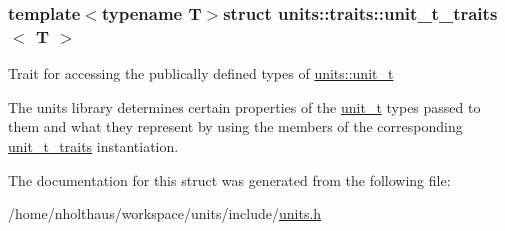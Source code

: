 \subsubsection*{template$<$typename T$>$struct units\+::traits\+::unit\+\_\+t\+\_\+traits$<$ T $>$}

Trait for accessing the publically defined types of {\ttfamily \hyperlink{classunits_1_1unit__t}{units\+::unit\+\_\+t}} 

The units library determines certain properties of the \hyperlink{classunits_1_1unit__t}{unit\+\_\+t} types passed to them and what they represent by using the members of the corresponding \hyperlink{structunits_1_1traits_1_1unit__t__traits}{unit\+\_\+t\+\_\+traits} instantiation. 

The documentation for this struct was generated from the following file\+:\begin{DoxyCompactItemize}
\item 
/home/nholthaus/workspace/units/include/\hyperlink{units_8h}{units.\+h}\end{DoxyCompactItemize}
